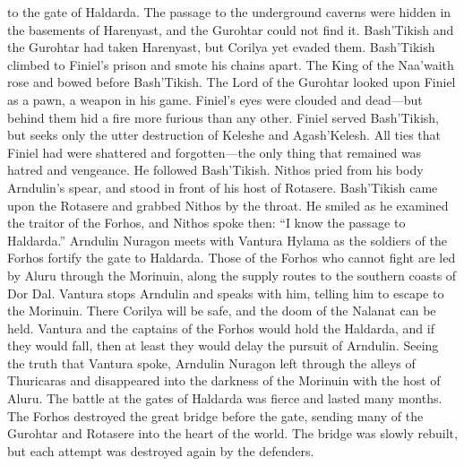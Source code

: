 \documentclass[smalldemyvopaper,11pt,twoside,onecolumn,openright,extrafontsizes]{memoir}
\begin{document}
to the gate of Haldarda. The passage to the underground caverns were hidden in the basements of Harenyast, and the Gurohtar could not find it.
	Bash’Tikish and the Gurohtar had taken Harenyast, but Corilya yet evaded them. Bash’Tikish climbed to Finiel’s prison and smote his chains apart. The King of the Naa’waith rose and bowed before Bash’Tikish. The Lord of the Gurohtar looked upon Finiel as a pawn, a weapon in his game. Finiel’s eyes were clouded and dead—but behind them hid a fire more furious than any other. Finiel served Bash’Tikish, but seeks only the utter destruction of Keleshe and Agash’Kelesh. All ties that Finiel had were shattered and forgotten—the only thing that remained was hatred and vengeance. He followed Bash’Tikish. Nithos pried from his body Arndulin’s spear, and stood in front of his host of Rotasere. Bash’Tikish came upon the Rotasere and grabbed Nithos by the throat. He smiled as he examined the traitor of the Forhos, and Nithos spoke then: “I know the passage to Haldarda.”
	Arndulin Nuragon meets with Vantura Hylama as the soldiers of the Forhos fortify the gate to Haldarda. Those of the Forhos who cannot fight are led by Aluru through the Morinuin, along the supply routes to the southern coasts of Dor Dal.
	Vantura stops Arndulin and speaks with him, telling him to escape to the Morinuin. There Corilya will be safe, and the doom of the Nalanat can be held. Vantura and the captains of the Forhos would hold the Haldarda, and if they would fall, then at least they would delay the pursuit of Arndulin. Seeing the truth that Vantura spoke, Arndulin Nuragon left through the alleys of Thuricaras and disappeared into the darkness of the Morinuin with the host of Aluru. The battle at the gates of Haldarda was fierce and lasted many months. The Forhos destroyed the great bridge before the gate, sending many of the Gurohtar and Rotasere into the heart of the world. The bridge was slowly rebuilt, but each attempt was destroyed again by the defenders.
\end{document}
